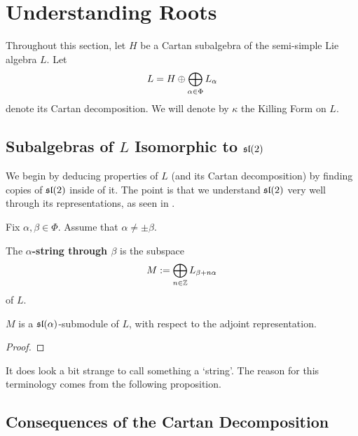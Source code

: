 \section{Understanding Roots}

Throughout this section, let $H$ be a Cartan subalgebra of the semi-simple Lie algebra $L$. Let
\begin{align*}
    L = H \+ \bigoplus_{\alpha \in \Phi} L_{\alpha}
\end{align*}
denote its Cartan decomposition. We will denote by $\kappa$ the Killing Form on $L$.

\subsection{Subalgebras of $L$ Isomorphic to $\sl{2}$}

We begin by deducing properties of $L$ (and its Cartan decomposition) by finding copies of $\sl{2}$ inside of it. The point is that we understand $\sl{2}$ very well through its representations, as seen in .


Fix $\alpha, \beta \in \Phi$. Assume that $\alpha \neq \pm \beta$.

\begin{boxdefinition}[Strings]
    The \textbf{$\alpha$-string through $\beta$} is the subspace
    \begin{align*}
        M := \bigoplus_{n \in \Z} L_{\beta + n\alpha}
    \end{align*}
    of $L$.
\end{boxdefinition}

\begin{lemma}
    $M$ is a $\sl{\alpha}$-submodule of $L$, with respect to the adjoint representation.
\end{lemma}
\begin{proof}
    \sorry %
\end{proof}

It does look a bit strange to call something a `string'. The reason for this terminology comes from the following proposition.

\begin{boxproposition}
    \sorry
\end{boxproposition}

\subsection{Consequences of the Cartan Decomposition}

